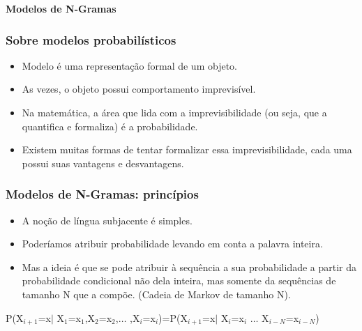 \documentclass[xcolor=table]{beamer}
\begin{document}
	\begin{frame}
		\centering \textbf{Modelos de N-Gramas\\}
	\end{frame}
	
	\begin{frame}
		\frametitle{Sobre modelos probabilísticos}
		\begin{itemize}
			\item Modelo é uma representação formal de um objeto.\\
			\item As vezes, o objeto possui comportamento imprevisível.\\
			\item Na matemática, a área que lida com a imprevisibilidade (ou seja, que a quantifica e formaliza) é a probabilidade.\\
			\item Existem muitas formas de tentar formalizar essa imprevisibilidade, cada uma possui suas vantagens e desvantagens.\\
		\end{itemize}
	\end{frame}
	\begin{frame}
		\frametitle{Modelos de N-Gramas: princípios}
		\begin{itemize}
			\item A noção de língua subjacente é simples.\\
			\item Poderíamos atribuir probabilidade levando em conta a palavra inteira.\\
			\item Mas a ideia é que se pode atribuir à sequência a sua probabilidade a partir da probabilidade condicional não dela inteira, mas somente da sequências de tamanho N que a compõe. (Cadeia de Markov de tamanho N).\\ 
		\end{itemize}
		{\small P(X$_{i+1}$=x$\mid$ X$_{1}$=x$_{1}$,X$_{2}$=x$_{2}$,$\ldots$ ,X$_{i}$=x$_{i}$)=P(X$_{i+1}$=x$\mid$ X$_{i}$=x$_{i}$ $\ldots$ X$_{i-N}$=x$_{i-N}$) }
	\end{frame}
	
\end{document}
